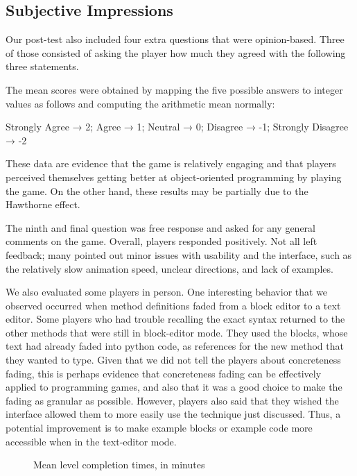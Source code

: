 \documentclass[12pt,notitlepage]{article}
\begin{document}

\subsection{Subjective Impressions}

Our post-test also included four extra questions that were opinion-based.
Three of those consisted of asking the player how much they agreed with
the following three statements.



The mean scores were obtained by mapping the five possible answers to integer
values as follows and computing the arithmetic mean normally:\\
\centerline{Strongly Agree → 2; Agree → 1; Neutral → 0; Disagree → -1; Strongly Disagree → -2}

These data are evidence that the game is relatively engaging and that players
perceived themselves getting better at object-oriented programming by playing
the game. On the other hand, these results may be partially due to the
Hawthorne effect.

The ninth and final question was free response and asked for any general
comments on the game. Overall, players responded positively. Not all left
feedback; many pointed out minor issues with usability and the interface,
such as the relatively slow animation speed, unclear directions, and lack
of examples.

We also evaluated some players in person.
One interesting behavior that we observed occurred when method definitions
faded from a block editor to a text editor. Some players who had trouble
recalling the exact syntax returned to the other methods that were still in
block-editor mode. They used the blocks, whose text had already faded into
python code, as references for the new method that they wanted to type. Given
that we did not tell the players about concreteness fading, this is perhaps
evidence that concreteness fading can be effectively applied to programming
games, and also that it was a good choice to make the fading as granular as
possible. However, players also said that they wished the interface allowed
them to more easily use the technique just discussed. Thus, a potential
improvement is to make example blocks or example code more accessible when
in the text-editor mode.

\begin{figure}
  \centering
  \caption{Mean level completion times, in minutes}\label{fig:level-completion-time}
\end{figure}
\end{document}

